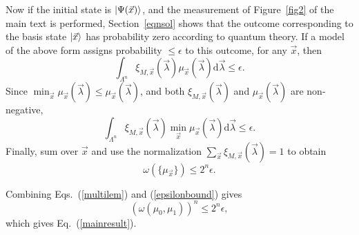 \documentclass[amsmath,amssymb,superscriptaddress,twocolumn,pra]{revtex4-1}
\begin{document}
Now if the initial state is $\ket{\Psi(\vec{x})}$, and the measurement of Figure~\ref{fig2} of the main text is performed, Section~\ref{eqnsol} shows that the outcome corresponding to the basis state $\ket{\vec{x}}$ has probability zero according to quantum theory. If a model of the above form assigns probability $\leq \epsilon$ to this outcome, for any $\vec{x}$, then
\begin{equation}
\int_{\Lambda^n} \xi_{M,\vec{x}}(\vec{\lambda}) \mu_{\vec{x}}(\vec{\lambda}) \mathrm{d}\vec{\lambda} \leq \epsilon.
\end{equation}
Since $\min_{\vec{x}} \mu_{\vec{x}}(\vec{\lambda}) \leq \mu_{\vec{x}}(\vec{\lambda})$, and both $\xi_{M,\vec{x}}(\vec{\lambda})$ and $\mu_{\vec{x}}(\vec{\lambda})$ are non-negative,
\begin{equation}
\int_{\Lambda^n} \xi_{M,\vec{x}}(\vec{\lambda}) \min_{\vec{x}} \mu_{\vec{x}}(\vec{\lambda}) \mathrm{d}\vec{\lambda} \leq \epsilon.
\end{equation}
Finally, sum over $\vec{x}$ and use the normalization $\sum_{\vec{x}} \xi_{M,\vec{x}}(\vec{\lambda}) = 1$ to obtain
\begin{equation}\label{epsilonbound}
\omega\left( \{ \mu_{\vec{x}} \} \right) \leq 2^n \epsilon.
\end{equation}


Combining Eqs.~(\ref{multilem}) and (\ref{epsilonbound}) gives
\begin{equation}
(\omega(\mu_0,\mu_1))^n \leq 2^n \epsilon,
\end{equation}
which gives Eq.~(\ref{mainresult}).
\end{document}

